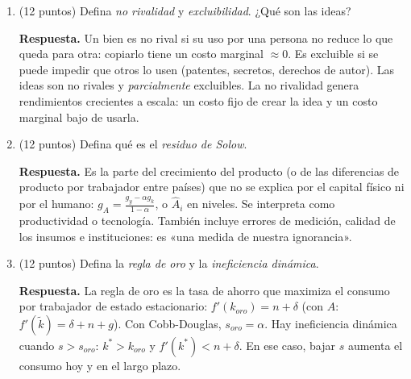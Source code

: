\documentclass[12pt,letterpaper]{article}
\begin{document}
\begin{enumerate}[label=\arabic*.,leftmargin=1.6em,itemsep=0.6em,start=8]
\item (12 puntos) Defina \emph{no rivalidad} y \emph{excluibilidad}. ¿Qué son las ideas?
\begin{resp}
\textbf{Respuesta.} Un bien es no rival si su uso por una persona no reduce lo que queda para otra: copiarlo tiene un costo marginal $\approx0$. Es excluible si se puede impedir que otros lo usen (patentes, secretos, derechos de autor). Las ideas son no rivales y \emph{parcialmente} excluibles. La no rivalidad genera rendimientos crecientes a escala: un costo fijo de crear la idea y un costo marginal bajo de usarla.
\end{resp}

\item (12 puntos) Defina qué es el \emph{residuo de Solow}.
\begin{resp}
\textbf{Respuesta.} Es la parte del crecimiento del producto (o de las diferencias de producto por trabajador entre países) que no se explica por el capital físico ni por el humano: $g_A=\frac{g_y-\alpha g_k}{1-\alpha}$, o $\hat A_i$ en niveles. Se interpreta como productividad o tecnología. También incluye errores de medición, calidad de los insumos e instituciones: es «una medida de nuestra ignorancia».
\end{resp}

\item (12 puntos) Defina la \emph{regla de oro} y la \emph{ineficiencia dinámica}.
\begin{resp}
\textbf{Respuesta.} La regla de oro es la tasa de ahorro que maximiza el consumo por trabajador de estado estacionario: $f'(k_{oro})=n+\delta$ (con $A$: $f'(\tilde k)=\delta+n+g$). Con Cobb-Douglas, $s_{oro}=\alpha$. Hay ineficiencia dinámica cuando $s>s_{oro}$: $k^*>k_{oro}$ y $f'(k^*)<n+\delta$. En ese caso, bajar $s$ aumenta el consumo hoy y en el largo plazo.
\end{resp}
\end{enumerate}

\end{document}

